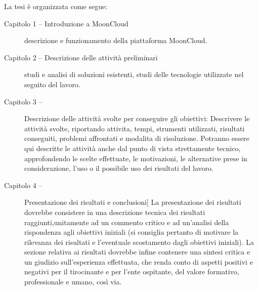 La tesi \`e organizzata come segue:
\begin{description}
    \item[Capitolo 1 -- Introduzione a MoonCloud] descrizione e funzionamento della piattaforma MoonCloud. 
    \item[Capitolo 2 -- Descrizione delle attività preliminari] studi e analisi di soluzioni esistenti, studi delle tecnologie utilizzate
    nel seguito del lavoro.
    \item[Capitolo 3 -- ] Descrizione delle attività svolte per conseguire gli obiettivi: Descrivere le attività svolte, 
    riportando attivita, tempi, strumenti utilizzati, risultati conseguiti, problemi affrontati e modalita di risoluzione. 
    Potranno essere qui descritte le attività anche dal punto di vista strettamente tecnico, approfondendo le scelte effettuate, 
    le motivazioni, le alternative prese in considerazione, l’uso o il possibile uso dei risultati del lavoro.
    \item[Capitolo 4 -- ] Presentazione dei risultati e conclusioni] La presentazione dei risultati dovrebbe consistere in una 
    descrizione tecnica dei risultati raggiunti,unitamente ad un commento critico e ad un’analisi della rispondenza agli 
    obiettivi iniziali (si consiglia pertanto di motivare 
    la rilevanza dei risultati e l’eventuale scostamento dagli obiettivi iniziali). La sezione relativa ai risultati dovrebbe 
    infine contenere una sintesi critica e un giudizio sull’esperienza effettuata, che renda conto di aspetti positivi e negativi
    per il tirocinante e per l’ente ospitante, del valore formativo, professionale e umano, così via.
\end{description}




